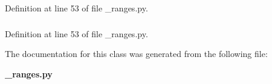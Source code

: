 \-Definition at line 53 of file \-\_\-ranges.\-py.

\subsubsection[{thresholds}]{}\label{classburst__calc_1_1msg_1_1__ranges_1_1ranges_a1f83d535a31a4a9264f273499c7e0047}


\-Definition at line 53 of file \-\_\-ranges.\-py.



\-The documentation for this class was generated from the following file\-:\begin{DoxyCompactItemize}
\item 
{\bf \-\_\-ranges.\-py}\end{DoxyCompactItemize}
